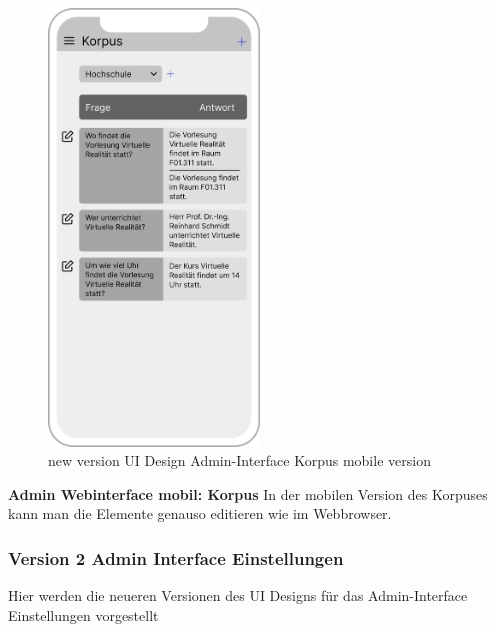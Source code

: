 \begin{figure}[H]
    \centering
    \includegraphics[width=0.5\textwidth]{bilder/new vers. UI Design/Korpus/iPhone X Korpus I.png}
    \caption{new version UI Design Admin-Interface Korpus mobile version}
    \label{fig:new version UI Design Admin-Interface Korpus mobile version}
\end{figure}
\noindent \textbf{Admin Webinterface mobil: Korpus} \newline
In der mobilen Version des Korpuses kann man die Elemente genauso editieren wie im Webbrowser.

\subsubsection{Version 2 Admin Interface Einstellungen}
Hier werden die neueren Versionen des UI Designs für das Admin-Interface Einstellungen vorgestellt

